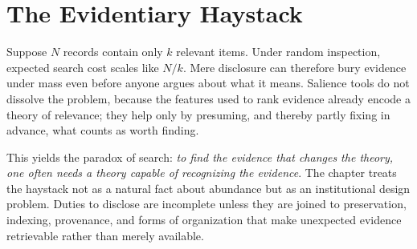 
\chapter{The Evidentiary Haystack}
\label{ch:ch024}

Suppose \(N\) records contain only \(k\) relevant items. Under random inspection, expected search cost scales like \(N/k\). Mere disclosure can therefore bury evidence under mass even before anyone argues about what it means. Salience tools do not dissolve the problem, because the features used to rank evidence already encode a theory of relevance; they help only by presuming, and thereby partly fixing in advance, what counts as worth finding.

This yields the paradox of search: \emph{to find the evidence that changes the theory, one often needs a theory capable of recognizing the evidence}. The chapter treats the haystack not as a natural fact about abundance but as an institutional design problem. Duties to disclose are incomplete unless they are joined to preservation, indexing, provenance, and forms of organization that make unexpected evidence retrievable rather than merely available.
